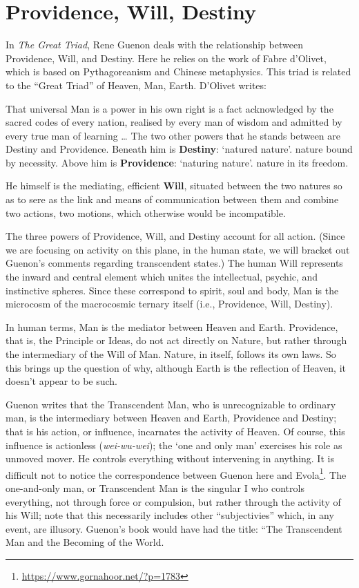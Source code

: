 \section{Providence, Will, Destiny}

In \emph{The Great Triad}, Rene Guenon deals with the relationship between Providence, Will, and Destiny. Here he relies on the work of Fabre d'Olivet, which is based on Pythagoreanism and Chinese metaphysics. This triad is related to the “Great Triad” of Heaven, Man, Earth. D'Olivet writes:

\begin{quotex}
That universal Man is a power in his own right is a fact acknowledged by the sacred codes of every nation, realised by every man of wisdom and admitted by every true man of learning … The two other powers that he stands between are Destiny and Providence. Beneath him is \textbf{Destiny}: `natured nature'. nature bound by necessity. Above him is \textbf{Providence}: `naturing nature'. nature in its freedom.

He himself is the mediating, efficient \textbf{Will}, situated between the two natures so as to sere as the link and means of communication between them and combine two actions, two motions, which otherwise would be incompatible.

\end{quotex}
The three powers of Providence, Will, and Destiny account for all action. (Since we are focusing on activity on this plane, in the human state, we will bracket out Guenon's comments regarding transcendent states.) The human Will represents the inward and central element which unites the intellectual, psychic, and instinctive spheres. Since these correspond to spirit, soul and body, Man is the microcosm of the macrocosmic ternary itself (i.e., Providence, Will, Destiny).

In human terms, Man is the mediator between Heaven and Earth. Providence, that is, the Principle or Ideas, do not act directly on Nature, but rather through the intermediary of the Will of Man. Nature, in itself, follows its own laws. So this brings up the question of why, although Earth is the reflection of Heaven, it doesn't appear to be such.

Guenon writes that the Transcendent Man, who is unrecognizable to ordinary man, is the intermediary between Heaven and Earth, Providence and Destiny; that is his action, or influence, incarnates the activity of Heaven. Of course, this influence is actionless (\emph{wei-wu-wei}); the `one and only man' exercises his role as unmoved mover. He controls everything without intervening in anything. It is difficult not to notice the correspondence between Guenon here and Evola\footnote{\url{https://www.gornahoor.net/?p=1783}}. The one-and-only man, or Transcendent Man is the singular I who controls everything, not through force or compulsion, but rather through the activity of his Will; note that this necessarily includes other “subjectivies” which, in any event, are illusory. Guenon's book would have had the title: “The Transcendent Man and the Becoming of the World.

